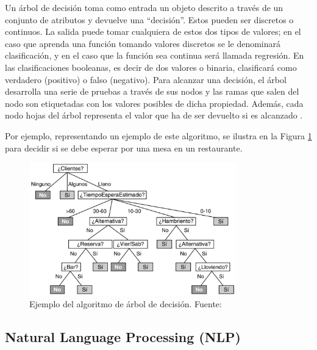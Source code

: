 \begin{itemize}
	Un árbol de decisión toma como entrada un objeto descrito a través de un conjunto de atributos y devuelve una “decisión”. Estos pueden ser discretos o continuos. La salida puede tomar cualquiera de estos dos tipos de valores; en el caso que aprenda una función tomando valores discretos se le denominará clasificación, y en el caso que la función sea continua será llamada regresión. En las clasificaciones booleanas, es decir de dos valores o binaria, clasificará como verdadero (positivo) o falso (negativo). Para alcanzar una decisión, el árbol desarrolla una serie de pruebas a través de sus nodos y las ramas que salen del nodo son etiquetadas con los valores posibles de dicha propiedad. Además, cada nodo hojas del árbol representa el valor que ha de ser devuelto si es alcanzado \parencite{bk_russell2004intart}.
	
	Por ejemplo, representando un ejemplo de este algoritmo, se ilustra en la Figura \ref{2:fig40} para decidir si se debe esperar por una mesa en un restaurante.
	\begin{figure}[h]
		\begin{center}
			\includegraphics[width=0.8\textwidth]{2/figures/arbol_decision.jpg}
			\caption{Ejemplo del algoritmo de árbol de decisión. Fuente: \cite{bk_russell2004intart}}
			\label{2:fig40}
		\end{center}
	\end{figure}
\end{itemize}

\subsection{Natural Language Processing (NLP)}

 